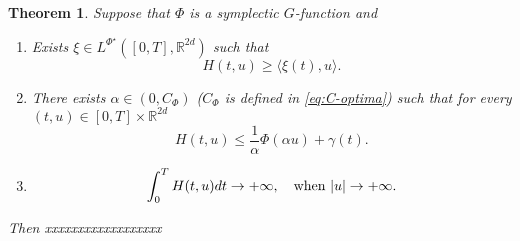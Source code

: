 \documentclass[twoside]{article}
\makeatletter
\newtheorem{thm}{Theorem}[section]
\theoremstyle{remark}
\newcommand{\labitem}[2]{%
\def\@itemlabel{#1}
\item
\def\@currentlabel{#1}\label{#2}}
\newcommand{\lpsi}{L^{\Phi^{\star}}}
\newcommand{\rr}{\mathbb{R}}
\renewcommand{\leq}{\leqslant}
\renewcommand{\geq}{\geqslant}
\makeatother
\begin{document}
\begin{thm} Suppose that $\Phi$ is a symplectic $G$-function and
\begin{enumerate}
 \labitem{H1)}{it:hip1}   Exists $\xi\in\lpsi([0,T],\rr^{2d})$ such that 
 \[H(t,u)\geq \langle \xi(t), u\rangle.
  \]
 \labitem{H2)}{it:hip2} There exists $\alpha\in (0,C_{\Phi})$ ($C_{\Phi}$ is   defined in \eqref{eq:C-optima}) such that for every $(t,u)\in [0,T]\times\rr^{2d}$
 \[
  H(t,u)\leq \frac{1}{\alpha}\Phi\left( \alpha u\right)+\gamma(t).
 \]
 \labitem{H3)}{it:hip3} 
 \[
  \int_0^TH(t,u)dt\to+\infty,\quad\hbox{when } |u|\to+\infty.
 \]

\end{enumerate}

Then xxxxxxxxxxxxxxxxxx

\end{thm}
\end{document}
